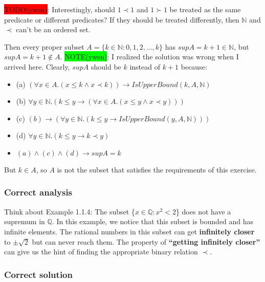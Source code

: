 \documentclass[12pt, letterpaper, oneside]{book}
\begin{document}
\colorbox{red}{TODO(ywen)}: Interestingly, should $1 \prec 1$ and $1 \succ 1$ be treated as the same predicate or
different predicates? If they should be treated differently, then $\mathbb{N}$ and $\prec$ can't be an ordered set.

Then every proper subset $A = \{ k \in \mathbb{N}: 0, 1, 2, \ldots, k \}$ has $sup A = k + 1 \in \mathbb{N}$, but
$sup A = k+1 \notin A$. \colorbox{lime}{NOTE(ywen)}: I realized the solution was wrong when I arrived here. Clearly,
$sup A$ should be $k$ instead of $k+1$ because:
\begin{itemize}
  \item (a) $(\forall x \in A. (x \le k \land x \prec k)) \rightarrow IsUpperBound(k, A, \mathbb{N})$
  \item (b) $\forall y \in \mathbb{N}. (k \le y \rightarrow (\forall x \in A. (x \le y \land x \prec y)))$
  \item (c) $(b) \rightarrow (\forall y \in \mathbb{N}. (k \le y \rightarrow IsUpperBound(y, A, \mathbb{N})))$
  \item (d) $\forall y \in \mathbb{N}. (k \le y \rightarrow k \prec y)$
  \item $(a) \land (c) \land (d) \rightarrow sup A = k$
\end{itemize}

But $k \in A$, so $A$ is not the subset that satisfies the requirements of this exercise.

\subsubsection{Correct analysis}

Think about Example 1.1.4: The subset \{$x \in \mathbb{Q}: x^2 < 2$\} does not have a supremum in $\mathbb{Q}$. In this
example, we notice that this subset is bounded and has infinite elements. The rational numbers in this subset can get
\textbf{infinitely closer} to $\pm \sqrt{2}$ but can never reach them. The property of \textbf{``getting infinitely
  closer''} can give us the hint of finding the appropriate binary relation $\prec$.

\subsubsection{Correct solution}
\end{document}
